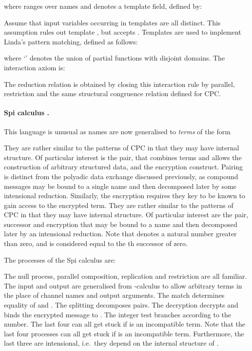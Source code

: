\documentclass{LMCS}
\begin{document}
where  ranges over names and  denotes a template field, defined by:

Assume that input variables occurring in templates are all distinct.
This assumption rules out template , but accepts .  Templates are used to implement Linda's pattern
matching, defined as follows:

where
`' denotes the union of partial functions with disjoint domains. The interaction axiom is:

The reduction relation is obtained by closing this interaction rule by parallel, restriction and the
same structural congruence relation defined for CPC.


\paragraph{Spi calculus \cite{gordon1997ccp}.} This language is unusual as names 
are now generalised to {\em terms} of the form

{They are rather similar to the patterns of CPC in that they may have
internal structure. Of
particular interest is the pair, that combines terms and allows the
construction of arbitrary structured data,
and the encryption construct.
Pairing is distinct from the polyadic data exchange
discussed previously, as compound messages may be bound to a single name
and then
decomposed later by some intensional reduction. Similarly, the encryption 
requires they key to be known to gain access to the encrypted term.}
{They are rather similar to the patterns of CPC in that they may have internal
structure. Of particular interest are the pair, successor and encryption that
may be bound to a name and then decomposed later by an intensional reduction.
Note that  denotes a natural number greater than zero, and is considered
equal to the th successor of zero.}

The processes of the Spi calculus are:

The null process, parallel composition, replication and restriction
are all familiar.
The input  and output  are generalised 
from -calculus to 
allow arbitrary terms in the place of channel names and output arguments.
The match  determines equality of  and .
The splitting  decomposes pairs.
The decryption  decrypts  
and binds the encrypted message to .
The integer test  branches
according to the number.
{The last four can all get stuck if  is an incompatible term.}
{Note that the last four processes can all get stuck if  is an incompatible term.
Furthermore, the last three are intensional, i.e.\ they depend on the internal
structure of .}
\end{document}
